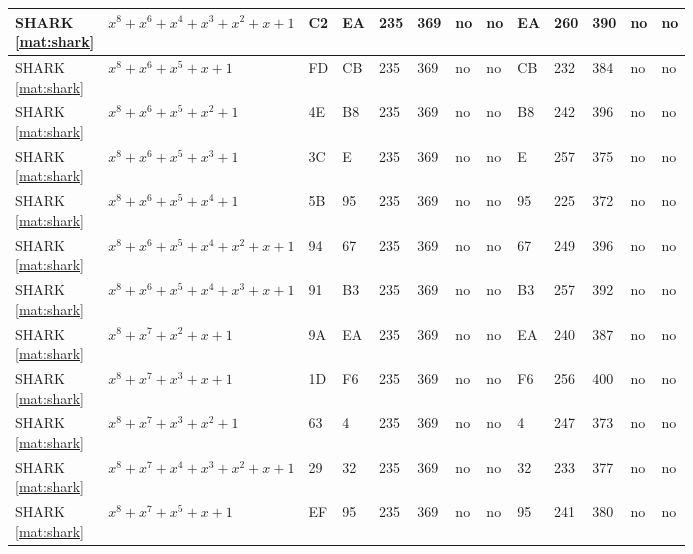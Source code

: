 \begin{tiny}
\begin{longtable}{|l|l|l|l|l|l|l|l|l|l|l|l|l|}
\shortstack{SHARK \\ \eqref{mat:shark}} & $x^8 + x^6 + x^4 + x^3 + x^2 + x + 1$ & C2 & EA & 235 & 369 & no & no & EA & 260 & 390 & no & no \\ \hline
\shortstack{SHARK \\ \eqref{mat:shark}} & $x^8 + x^6 + x^5 + x + 1$ & FD & CB & 235 & 369 & no & no & CB & 232 & 384 & no & no \\ \hline
\shortstack{SHARK \\ \eqref{mat:shark}} & $x^8 + x^6 + x^5 + x^2 + 1$ & 4E & B8 & 235 & 369 & no & no & B8 & 242 & 396 & no & no \\ \hline
\shortstack{SHARK \\ \eqref{mat:shark}} & $x^8 + x^6 + x^5 + x^3 + 1$ & 3C & E & 235 & 369 & no & no & E & 257 & 375 & no & no \\ \hline
\shortstack{SHARK \\ \eqref{mat:shark}} & $x^8 + x^6 + x^5 + x^4 + 1$ & 5B & 95 & 235 & 369 & no & no & 95 & 225 & 372 & no & no \\ \hline
\shortstack{SHARK \\ \eqref{mat:shark}} & $x^8 + x^6 + x^5 + x^4 + x^2 + x + 1$ & 94 & 67 & 235 & 369 & no & no & 67 & 249 & 396 & no & no \\ \hline
\shortstack{SHARK \\ \eqref{mat:shark}} & $x^8 + x^6 + x^5 + x^4 + x^3 + x + 1$ & 91 & B3 & 235 & 369 & no & no & B3 & 257 & 392 & no & no \\ \hline
\shortstack{SHARK \\ \eqref{mat:shark}} & $x^8 + x^7 + x^2 + x + 1$ & 9A & EA & 235 & 369 & no & no & EA & 240 & 387 & no & no \\ \hline
\shortstack{SHARK \\ \eqref{mat:shark}} & $x^8 + x^7 + x^3 + x + 1$ & 1D & F6 & 235 & 369 & no & no & F6 & 256 & 400 & no & no \\ \hline
\shortstack{SHARK \\ \eqref{mat:shark}} & $x^8 + x^7 + x^3 + x^2 + 1$ & 63 & 4 & 235 & 369 & no & no & 4 & 247 & 373 & no & no \\ \hline
\shortstack{SHARK \\ \eqref{mat:shark}} & $x^8 + x^7 + x^4 + x^3 + x^2 + x + 1$ & 29 & 32 & 235 & 369 & no & no & 32 & 233 & 377 & no & no \\ \hline
\shortstack{SHARK \\ \eqref{mat:shark}} & $x^8 + x^7 + x^5 + x + 1$ & EF & 95 & 235 & 369 & no & no & 95 & 241 & 380 & no & no \\ \hline

\end{longtable}
\end{tiny}
